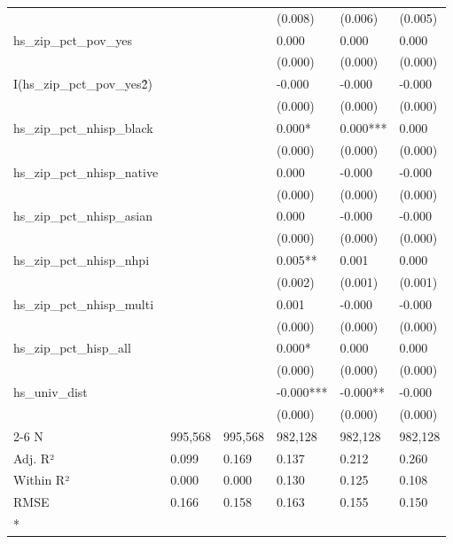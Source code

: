 \begin{longtable}[t]{llllll}
 &  &  & (0.008) & (0.006) & (0.005)\\
hs\_zip\_pct\_pov\_yes &  &  & 0.000 & 0.000 & 0.000\\
 &  &  & (0.000) & (0.000) & \vphantom{7} (0.000)\\
I(hs\_zip\_pct\_pov\_yes\^2) &  &  & -0.000 & -0.000 & -0.000\\
\addlinespace
 &  &  & (0.000) & (0.000) & \vphantom{6} (0.000)\\
hs\_zip\_pct\_nhisp\_black &  &  & 0.000* & 0.000*** & 0.000\\
 &  &  & (0.000) & (0.000) & \vphantom{5} (0.000)\\
hs\_zip\_pct\_nhisp\_native &  &  & 0.000 & -0.000 & -0.000\\
 &  &  & (0.000) & (0.000) & \vphantom{4} (0.000)\\
\addlinespace
hs\_zip\_pct\_nhisp\_asian &  &  & 0.000 & -0.000 & -0.000\\
 &  &  & (0.000) & (0.000) & \vphantom{3} (0.000)\\
hs\_zip\_pct\_nhisp\_nhpi &  &  & 0.005** & 0.001 & 0.000\\
 &  &  & (0.002) & (0.001) & (0.001)\\
hs\_zip\_pct\_nhisp\_multi &  &  & 0.001 & -0.000 & -0.000\\
\addlinespace
 &  &  & (0.000) & (0.000) & \vphantom{2} (0.000)\\
hs\_zip\_pct\_hisp\_all &  &  & 0.000* & 0.000 & 0.000\\
 &  &  & (0.000) & (0.000) & \vphantom{1} (0.000)\\
hs\_univ\_dist &  &  & -0.000*** & -0.000** & -0.000\\
 &  &  & (0.000) & (0.000) & (0.000)\\
\cline{2-6}
\addlinespace
N & 995,568 & 995,568 & 982,128 & 982,128 & 982,128\\
Adj. R² & 0.099 & 0.169 & 0.137 & 0.212 & 0.260\\
Within R² & 0.000 & 0.000 & 0.130 & 0.125 & 0.108\\
RMSE & 0.166 & 0.158 & 0.163 & 0.155 & 0.150\\*
\end{longtable}
\endgroup{}
